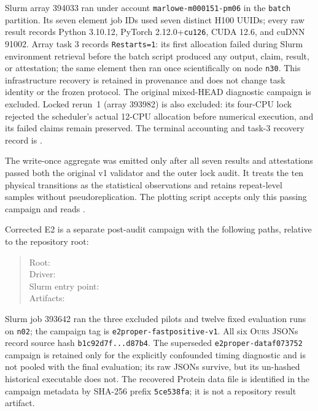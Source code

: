 \documentclass[11pt]{article}
\newcommand{\ours}{\textsc{Ours}}
\begin{document}
Slurm array 394033 ran under account \texttt{marlowe-m000151-pm06} in the
\texttt{batch} partition.  Its seven element job IDs used seven distinct
H100 UUIDs; every raw result records Python 3.10.12, PyTorch
2.12.0+\texttt{cu126}, CUDA 12.6, and cuDNN 91002.  Array task 3 records
\texttt{Restarts=1}: its first allocation failed during Slurm environment
retrieval before the batch script produced any output, claim, result, or
attestation; the same element then ran once scientifically on node
\texttt{n30}.  This infrastructure recovery is retained in provenance and
does not change task identity or the frozen protocol.  The original
mixed-HEAD diagnostic campaign is excluded.  Locked rerun~1 (array 393982)
is also excluded: its four-CPU lock rejected the scheduler's actual
12-CPU allocation before numerical execution, and its failed claims remain
preserved.  The terminal accounting and task-3 recovery record is
.

The write-once aggregate was emitted only after all seven results and
attestations passed both the original v1 validator and the outer lock audit.
It treats the ten physical transitions as the statistical observations and
retains repeat-level samples without pseudoreplication.  The plotting script
 accepts only this
passing campaign and reads
.

Corrected E2 is a separate post-audit campaign with the following paths,
relative to the repository root:
\begin{quote}
\small
Root: \\
Driver: \\
Slurm entry point: \\
Artifacts: 
\end{quote}
Slurm job 393642 ran the three excluded pilots and twelve fixed evaluation
runs on \texttt{n02}; the campaign tag is
\texttt{e2proper-fastpositive-v1}.  All six \ours{} JSONs record source hash
\texttt{b1c92d7f...d87b4}.
The superseded \texttt{e2proper-dataf073752} campaign is retained only for
the explicitly confounded timing diagnostic and is not pooled with the final
evaluation; its raw JSONs survive, but its un-hashed historical executable
does not.  The recovered Protein data file is identified in the campaign
metadata by SHA-256 prefix \texttt{5ce538fa}; it is not a repository result
artifact.
\end{document}
